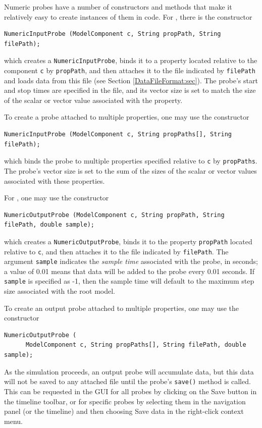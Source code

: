 Numeric probes have a number of constructors and methods that make it
relatively easy to create instances of them in code. For 
, there
is the constructor
%
\begin{lstlisting}[]
   NumericInputProbe (ModelComponent c, String propPath, String filePath);
\end{lstlisting}
%
which creates a {\tt NumericInputProbe}, binds it to a property
located relative to the component {\tt c} by {\tt propPath}, and then
attaches it to the file indicated by {\tt filePath} and loads data
from this file (see Section \ref{DataFileFormat:sec}). The probe's start and
stop times are specified in the file, and its vector size is
set to match the size of the scalar or vector value associated with
the property.

To create a probe attached to multiple properties, one may use the
constructor
%
\begin{lstlisting}[]
   NumericInputProbe (ModelComponent c, String propPaths[], String filePath);
\end{lstlisting}
%
which binds the probe to multiple properties specified relative to
{\tt c} by {\tt propPaths}. The probe's vector size is set to
the sum of the sizes of the scalar or vector values associated with
these properties.

For , one may use
the constructor
%
\begin{lstlisting}[]
   NumericOutputProbe (ModelComponent c, String propPath, String filePath, double sample);
\end{lstlisting}
%
which creates a {\tt NumericOutputProbe}, binds it to the property
{\tt propPath} located relative to {\tt c}, and then attaches it to
the file indicated by {\tt filePath}. The argument {\tt sample}
indicates the {\it sample time} associated with the probe, in seconds;
a value of 0.01 means that data will be added to the probe every 0.01
seconds.  If {\tt sample} is specified as -1, then the sample time
will default to the maximum step size associated with the root model.

To create an output probe attached to multiple properties, one may use the
constructor
%
\begin{lstlisting}[]
   NumericOutputProbe (
      ModelComponent c, String propPaths[], String filePath, double sample);
\end{lstlisting}
%

\begin{sideblock}
As the simulation proceeds, an output probe will accumulate data, but
this data will not be saved to any attached file until the probe's
{\tt save()} method is called. This can be requested in the GUI for
all probes by clicking on the {\sf Save} button in the timeline
toolbar, or for specific probes by selecting them in the navigation
panel (or the timeline) and then choosing {\sf Save data} in the
right-click context menu.
\end{sideblock}

